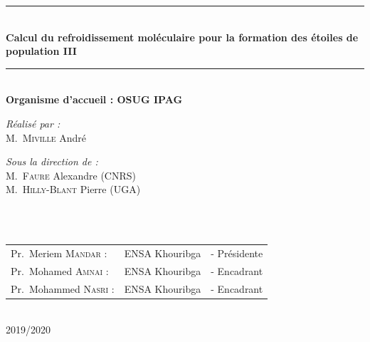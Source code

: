 \documentclass[10pt, a4paper]{report}
\numberwithin{equation}{subsection}
\begin{document}
\begin{titlepage}
\begin{center}
\rule{\linewidth}{0.3mm} \\[0.4cm]
{ \huge \bfseries\color{blue!70!black} Calcul du refroidissement moléculaire pour la formation des étoiles de population III \\[0.4cm] }
\rule{\linewidth}{0.3mm} \\[1cm]
{\large \bfseries Organisme d'accueil : OSUG IPAG}\\[1cm]
\noindent
\begin{minipage}{0.4\textwidth}
  \begin{flushleft} \large
    \emph{\color{orange!80!black}Réalisé par :}\\
    M.~\textsc{Miville} André\\
  \end{flushleft}
\end{minipage}%
\begin{minipage}{0.5\textwidth}
  \begin{flushright} \large
    \emph{\color{orange!80!black}Sous la direction de :} \\
    M.~\textsc{Faure} Alexandre (CNRS)\\
    M.~\textsc{Hilly-Blant} Pierre (UGA)\\
  \end{flushright}
\end{minipage}\\[1cm]

\\[0.5cm]

\color{black}
\centering
\begin{tabular}{lll}
\large Pr.~Meriem \textsc{Mandar} : & \large ENSA Khouribga & \large - Présidente \\[0.1cm]
\large Pr.~Mohamed \textsc{Amnai} : & \large ENSA Khouribga & \large - Encadrant \\[0.1cm]
\large Pr.~Mohammed \textsc{Nasri} : & \large ENSA Khouribga & \large - Encadrant
\end{tabular}

\vfill

{\large \color{orange!80!black}{Année universitaire}\\ \color{blue!80!black}2019/2020}

\end{center}
\end{titlepage}
\end{document}
